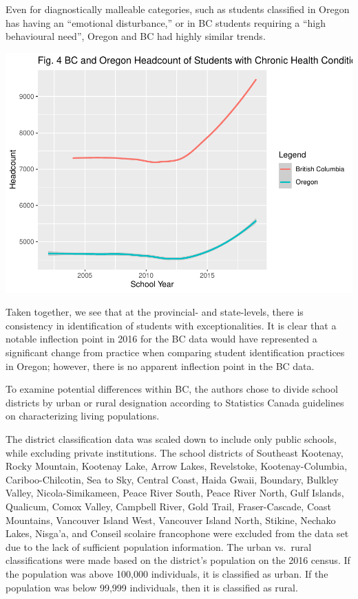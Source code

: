 \documentclass[
  english,
  man,floatsintext]{apa6}
\begin{document}
Even for diagnostically malleable categories, such as students classified in Oregon has having an \enquote{emotional disturbance,} or in BC students requiring a \enquote{high behavioural need}, Oregon and BC had highly similar trends.

\includegraphics{Final_project_files/figure-latex/BCOR combo-1.pdf}

Taken together, we see that at the provincial- and state-levels, there is consistency in identification of students with exceptionalities. It is clear that a notable inflection point in 2016 for the BC data would have represented a significant change from practice when comparing student identification practices in Oregon; however, there is no apparent inflection point in the BC data.

To examine potential differences within BC, the authors chose to divide school districts by urban or rural designation according to Statistics Canada guidelines on characterizing living populations.

The district classification data was scaled down to include only public schools, while excluding private institutions. The school districts of Southeast Kootenay, Rocky Mountain, Kootenay Lake, Arrow Lakes, Revelstoke, Kootenay-Columbia, Cariboo-Chilcotin, Sea to Sky, Central Coast, Haida Gwaii, Boundary, Bulkley Valley, Nicola-Simikameen, Peace River South, Peace River North, Gulf Islands, Qualicum, Comox Valley, Campbell River, Gold Trail, Fraser-Cascade, Coast Mountains, Vancouver Island West, Vancouver Island North, Stikine, Nechako Lakes, Nisga'a, and Conseil scolaire francophone were excluded from the data set due to the lack of sufficient population information. The urban vs.~rural classifications were made based on the district's population on the 2016 census. If the population was above 100,000 individuals, it is classified as urban. If the population was below 99,999 individuals, then it is classified as rural.
\end{document}
